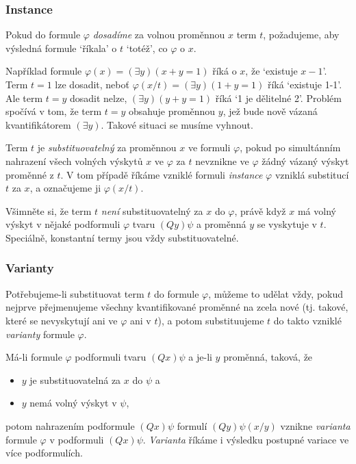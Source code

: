 \subsubsection{Instance}

Pokud do formule $\varphi$ \emph{dosadíme} za volnou proměnnou $x$ term $t$, požadujeme, aby výsledná formule `říkala' o $t$ `totéž', co $\varphi$ o $x$. 

\begin{example}
    Například formule $\varphi(x)=(\exists y)(x+y=1)$ říká o $x$, že `existuje $x-1$'. Term $t=1$ lze dosadit, neboť $\varphi(x/t)=(\exists y)(1+y=1)$ říká `existuje 1-1'. Ale term $t=y$ dosadit nelze, $(\exists y)(y+y=1)$ říká `1 je dělitelné 2'. Problém spočívá v tom, že term $t=y$ obsahuje proměnnou $y$, jež bude nově vázaná kvantifikátorem $(\exists y)$. Takové situaci se musíme vyhnout.
\end{example}

\begin{definition}
    Term $t$ je \emph{substituovatelný} za proměnnou $x$ ve formuli $\varphi$, pokud po simultánním nahrazení všech volných výskytů $x$ ve $\varphi$ za $t$ nevznikne ve $\varphi$ žádný vázaný výskyt proměnné z $t$. V tom případě říkáme vzniklé formuli \emph{instance} $\varphi$ vzniklá substitucí $t$ za $x$, a označujeme ji $\varphi(x/t)$.
\end{definition}

\begin{remark}
    Všimněte si, že term $t$ \emph{není} substituovatelný za $x$ do $\varphi$, právě když $x$ má volný výskyt v nějaké podformuli $\varphi$ tvaru $(Qy)\psi$ a proměnná $y$ se vyskytuje v $t$. Speciálně, konstantní termy jsou vždy substituovatelné.    
\end{remark}

\subsubsection{Varianty}

Potřebujeme-li substituovat term $t$ do formule $\varphi$, můžeme to udělat vždy, pokud nejprve přejmenujeme všechny kvantifikované proměnné na zcela nové (tj. takové, které se nevyskytují ani ve $\varphi$ ani v $t$), a potom substituujeme $t$ do takto vzniklé \emph{varianty} formule $\varphi$.

\begin{definition}[Varianta]
   Má-li formule $\varphi$ podformuli tvaru $(Qx)\psi$ a je-li $y$ proměnná, taková, že
   \begin{itemize}
    \item $y$ je substituovatelná za $x$ do $\psi$ a
    \item $y$ nemá volný výskyt v $\psi$,
   \end{itemize} 
potom nahrazením podformule $(Qx)\psi$ formulí $(Qy)\psi(x/y)$ vznikne \emph{varianta} formule $\varphi$ v podformuli $(Qx)\psi$. \emph{Varianta} říkáme i výsledku postupné variace ve více podformulích.
\end{definition}

